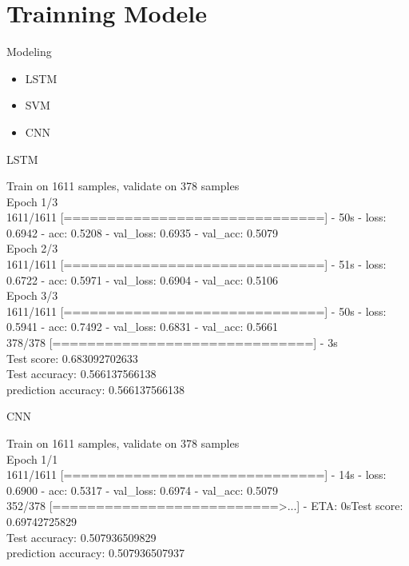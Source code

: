 \documentclass[
 size=12pt,
 paper=smartboard, %
 mode=present, %
 display=slides, %
style=tuliplab,
pauseslide,
fleqn,leqno]{powerdot}
\begin{document}
\section{Trainning Modele}

\begin{slide}[toc=,bm=]{Modeling}
\begin{itemize}
  \item LSTM\\
  \item  SVM\\
  \item  CNN\\
\end{itemize}
\end{slide}

\begin{slide}[toc=,bm=]{LSTM}
\begin{itemize}
  \hspace{0.5cm}
  Train on 1611 samples, validate on 378 samples\\
Epoch 1/3\\
1611/1611 [==============================] - 50s - loss: 0.6942 - acc: 0.5208 - val_loss: 0.6935 - val_acc: 0.5079\\
Epoch 2/3\\
1611/1611 [==============================] - 51s - loss: 0.6722 - acc: 0.5971 - val_loss: 0.6904 - val_acc: 0.5106\\
Epoch 3/3\\
1611/1611 [==============================] - 50s - loss: 0.5941 - acc: 0.7492 - val_loss: 0.6831 - val_acc: 0.5661\\
378/378 [==============================] - 3s \\    
Test score: 0.683092702633\\
Test accuracy: 0.566137566138\\
prediction accuracy:  0.566137566138\\
\vspace{1cm}
\end{itemize}
\end{slide}

\begin{slide}[toc=,bm=]{CNN}
  \begin{itemize}
    \hspace{0.5cm}
    Train on 1611 samples, validate on 378 samples\\
Epoch 1/1\\
1611/1611 [==============================] - 14s - loss: 0.6900 - acc: 0.5317 - val_loss: 0.6974 - val_acc: 0.5079\\
352/378 [==========================>...] - ETA: 0sTest score: 0.69742725829\\
Test accuracy: 0.507936509829\\
prediction accuracy:  0.507936507937\\
  \vspace{1cm}
  \end{itemize}
  \end{slide}
\end{document}
